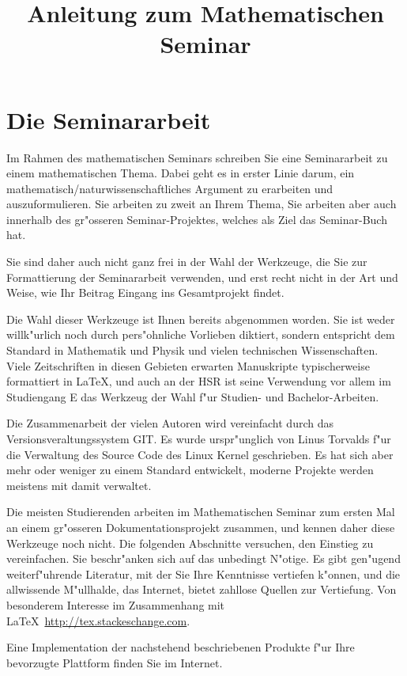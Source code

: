 \documentclass[a4paper,12pt]{article}
\begin{document}
\title{Anleitung zum Mathematischen Seminar}
\date{}
\maketitle
\section{Die Seminararbeit}
Im Rahmen des mathematischen Seminars schreiben Sie eine Seminararbeit
zu einem mathematischen Thema.
Dabei geht es in erster Linie darum, ein mathematisch/naturwissenschaftliches
Argument zu erarbeiten und auszuformulieren.
Sie arbeiten zu zweit an Ihrem Thema, Sie arbeiten aber auch 
innerhalb des gr"osseren Seminar-Projektes, welches als Ziel das
Seminar-Buch hat.

Sie sind daher auch nicht ganz frei in der Wahl der Werkzeuge, die Sie
zur Formattierung der Seminararbeit verwenden, und erst recht nicht
in der Art und Weise, wie Ihr Beitrag Eingang ins Gesamtprojekt findet.

Die Wahl dieser Werkzeuge ist Ihnen bereits abgenommen worden.
Sie ist weder willk"urlich noch durch pers"ohnliche Vorlieben diktiert,
sondern entspricht dem Standard in Mathematik und Physik und vielen
technischen Wissenschaften.
Viele Zeitschriften in diesen Gebieten erwarten Manuskripte typischerweise
formattiert in \LaTeX, und auch an der HSR ist seine Verwendung 
vor allem im Studiengang E das Werkzeug der Wahl f"ur Studien- und
Bachelor-Arbeiten.

Die Zusammenarbeit der vielen Autoren wird vereinfacht durch das
Versionsveraltungssystem GIT.
Es wurde urspr"unglich von Linus Torvalds f"ur die Verwaltung des
Source Code des Linux Kernel geschrieben.
Es hat sich aber mehr oder weniger zu einem Standard entwickelt,
moderne Projekte werden meistens mit damit verwaltet.

Die meisten Studierenden arbeiten im Mathematischen Seminar zum ersten
Mal an einem gr"osseren Dokumentationsprojekt zusammen, und kennen daher
diese Werkzeuge noch nicht.
Die folgenden Abschnitte versuchen, den Einstieg zu vereinfachen.
Sie beschr"anken sich auf das unbedingt N"otige.
Es gibt gen"ugend weiterf"uhrende Literatur, mit der Sie Ihre Kenntnisse
vertiefen k"onnen, und die allwissende M"ullhalde, das Internet,
bietet zahllose Quellen zur Vertiefung.
Von besonderem Interesse im Zusammenhang mit
\LaTeX\ \url{http://tex.stackeschange.com}.

Eine Implementation der nachstehend beschriebenen Produkte f"ur
Ihre bevorzugte Plattform finden Sie im Internet.
\end{document}
